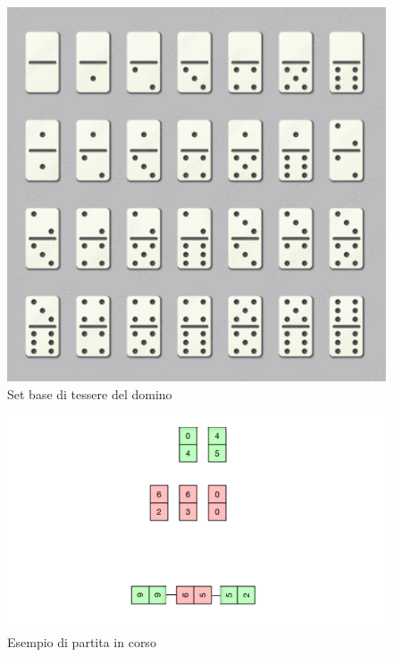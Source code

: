 \documentclass[a4paper,12pt]{report} %
\begin{document}
\begin{figure}[h!]
    \centering
    \includegraphics[width=1\textwidth]{imgs/domino_set.png} %
    \caption{Set base di tessere del domino}
    \label{fig:etichetta}
\end{figure}


\begin{figure}[h!]
    \centering
    \includegraphics[width=1\textwidth]{imgs/domino_table.png} %
    \caption{Esempio di partita in corso}
    \label{fig:etichetta}
\end{figure}
\end{document}
